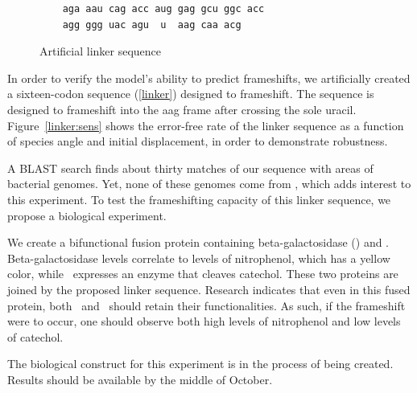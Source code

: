 \documentclass[12pt]{article}
\numberwithin{equation}{section}
\begin{document}
\begin{figure}
  \caption{Artificial linker sequence}
  \label{linker}
  \begin{verbatim}
    aga aau cag acc aug gag gcu ggc acc
    agg ggg uac agu  u  aag caa acg
  \end{verbatim}
\end{figure}

In order to verify the model's ability to predict frameshifts, we
artificially created a sixteen-codon sequence (\autoref{linker})
designed to frameshift.  The sequence is designed to frameshift into
the aag frame after crossing the sole uracil.  Figure~\ref{linker:sens}
shows the error-free rate of the linker sequence as a function of species
angle and initial displacement, in order to demonstrate robustness.

A BLAST search finds about thirty matches of our sequence with areas of
bacterial genomes.  Yet, none of these genomes come from \ecoli, which 
adds interest to this experiment.  To test the frameshifting capacity of
this linker sequence, we propose a biological experiment.

We create a bifunctional fusion protein containing beta-galactosidase (\bgals) 
and \xylE.  Beta-galactosidase levels correlate to
levels of nitrophenol, which has a yellow color, while \xylE\ expresses
an enzyme that cleaves catechol.  These two proteins are joined by
the proposed linker sequence.  Research indicates that even in this
fused protein, both \bgals\ and \xylE\ should retain their functionalities.
As such, if the frameshift were to occur, one should observe both 
high levels of nitrophenol and low levels of catechol.

The biological construct for this experiment is in the process of being created.
Results should be available by the middle of October.


\begin{singlespace}
  
\end{singlespace}
\end{document}
